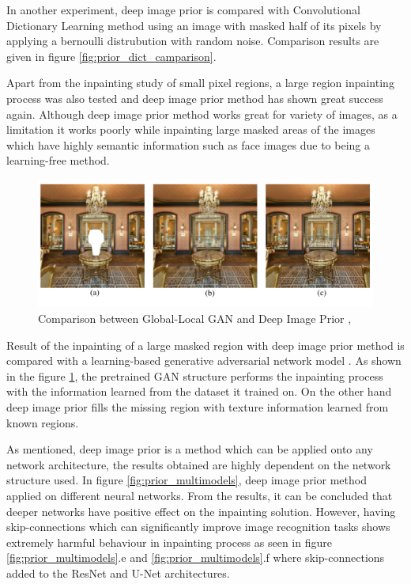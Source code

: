 In another experiment, deep image prior is compared with Convolutional Dictionary Learning method \cite{conv_dict_learning} using an image with masked half of its pixels by applying a bernoulli distrubution \cite{bernoulli} with random noise. Comparison results are given in figure \ref{fig:prior_dict_camparison}.

Apart from the inpainting study of small pixel regions, a large region inpainting process was also tested and deep image prior method has shown great success again. Although deep image prior method works great for variety of images, as a limitation it works poorly while inpainting large masked areas of the images which have highly semantic information such as face images due to being a learning-free method.

\begin{figure}[h!]
    \centering
    \includegraphics[width=13cm]{figures/chapter4/imprior3.png}
    \caption{Comparison between Global-Local GAN and Deep Image Prior \cite{Iizuka2017}, \cite{deep_image_prior}}
    \label{fig:prior_gan_comparison}
\end{figure}

Result of the inpainting of a large masked region with deep image prior method is compared with a learning-based generative adversarial network model \cite{Iizuka2017}. As shown in the figure \ref{fig:prior_gan_comparison}, the pretrained GAN structure performs the inpainting process with the information learned from the dataset it trained on. On the other hand deep image prior fills the missing region with texture information learned from known regions.

As mentioned, deep image prior is a method which can be applied onto any network architecture, the results obtained are highly dependent on the network structure used. In figure \ref{fig:prior_multimodels}, deep image prior method applied on different neural networks. From the results, it can be concluded that deeper networks have positive effect on the inpainting solution. However, having skip-connections which can significantly improve image recognition tasks shows extremely harmful behaviour in inpainting process as seen in figure \ref{fig:prior_multimodels}.e and \ref{fig:prior_multimodels}.f where skip-connections added to the ResNet \cite{deep_residual_recognition} and U-Net \cite{unet} architectures.

